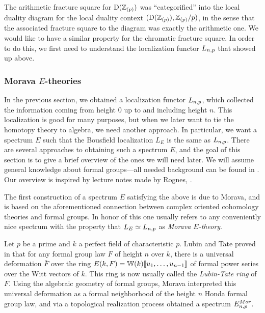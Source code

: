 \begin{remark}
    \label{ch0:rm:chromatic-square-from-duality}
    The arithmetic fracture square for $\mathrm{D}(\mathbb{Z}_{(p)})$ was ``categorified'' into the local duality diagram for the local duality context $(\mathrm{D}(\mathbb{Z}_{(p)}), \mathbb{Z}_{(p)}/p)$, in the sense that the associated fracture square to the diagram was exactly the arithmetic one. We would like to have a similar property for the chromatic fracture square. In order to do this, we first need to understand the localization functor $L_{n,p}$ that showed up above. 
\end{remark}  






\subsubsection{Morava \texorpdfstring{$E$}{E}-theories}
\label{ch0:sssec:morava-E-theories}

In the previous section, we obtained a localization functor $L_{n,p}$, which collected the information coming from height $0$ up to and including height $n$. This localization is good for many purposes, but when we later want to tie the homotopy theory to algebra, we need another approach. In particular, we want a spectrum $E$ such that the Bousfield localization $L_E$ is the same as $L_{n,p}$. There are several approaches to obtaining such a spectrum $E$, and the goal of this section is to give a brief overview of the ones we will need later. We will assume general knowledge about formal groups---all needed background can be found in \cite[Appendix 2]{ravenel_86}. Our overview is inspired by lecture notes made by Rognes, \cite{rognes_2023}. 

The first construction of a spectrum $E$ satisfying the above is due to Morava, and is based on the aforementioned connection between complex oriented cohomology theories and formal groups. In honor of this one usually refers to any conveniently nice spectrum with the property that $L_E \simeq L_{n,p}$ as \emph{Morava $E$-theory}.

\begin{construction}
    Let $p$ be a prime and $k$ a perfect field of characteristic $p$. Lubin and Tate proved in \cite{lubin-tate_66} that for any formal group law $F$ of height $n$ over $k$, there is a universal deformation $\bar{F}$ over the ring $E(k, F)=\mathbb{W}(k)[\![ u_1, \ldots, u_{n-1}]\!]$ of formal power series over the Witt vectors of $k$. This ring is now usually called the \emph{Lubin-Tate ring} of $F$. Using the algebraic geometry of formal groups, Morava interpreted this universal deformation as a formal neighborhood of the height $n$ Honda formal group law, and via a topological realization process obtained a spectrum $E^{Mor}_{n,p}$.
\end{construction}

